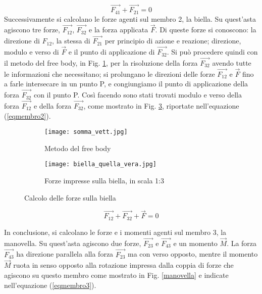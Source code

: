 \documentclass{article}
\begin{document}
\begin{equation}
    \Vec{F_{41}} + \vec{F_{21}} = 0
    \label{eqmembro1}
\end{equation}
\newpage
Successivamente si calcolano le forze agenti sul membro 2, la biella. Su quest’asta agiscono tre forze, $\Vec{F_{12}}$, $\Vec{F_{32}}$ e la forza applicata $\Vec{F}$. Di queste forze si conoscono: la direzione di $F_{12}$, la stessa di $\Vec{F_{21}}$ per principio di azione e reazione; direzione, modulo e verso di $\Vec{F}$ e il punto di applicazione di $\Vec{F_{32}}$. Si può procedere quindi con il metodo del free body, in Fig. \ref{freebody}, per la risoluzione della forza $\Vec{F_{32}}$ avendo tutte le informazioni che necessitano; si prolungano le direzioni delle forze $\Vec{F_{12}}$ e $\Vec{F}$ fino a farle intersecare in un punto P, e congiungiamo il punto di applicazione della forza $\Vec{F_{32}}$ con il punto P. Così facendo sono stati trovati modulo e verso della forza $\Vec{F_{12}}$ e della forza $\Vec{F_{32}}$, come mostrato in Fig. \ref{biella}, riportate nell’equazione (\ref{eqmembro2}).

\begin{figure} [h!]
\centering
    \begin{subfigure}{0.35\textwidth}
        \texttt{[image: somma\_vett.jpg]}
        \caption{Metodo del free body}
        \label{freebody}
    \end{subfigure}
    \begin{subfigure}{0.5\textwidth}
        \texttt{[image: biella\_quella\_vera.jpg]}
    \caption{Forze impresse sulla biella, in scala 1:3}
    \label{biella}
    \end{subfigure}
    \caption{Calcolo delle forze sulla biella}
\end{figure}

\begin{equation}
    \Vec{F_{12}} + \Vec{F_{32}} + \Vec{F} = 0
    \label{eqmembro2}
\end{equation}

In conclusione, si calcolano le forze e i momenti agenti sul membro 3, la manovella. Su quest’asta agiscono due forze, $\Vec{F_{23}}$ e $\Vec{F_{43}}$ e un momento $\Vec{M}$. La forza $\Vec{F_{43}}$ ha direzione parallela alla forza $\Vec{F_{23}}$ ma con verso opposto, mentre il momento $\Vec{M}$ ruota in senso opposto alla rotazione impressa dalla coppia di forze che agiscono su questo membro come mostrato in Fig. \ref{manovella} e indicate nell’equazione (\ref{eqmembro3}).
\end{document}
